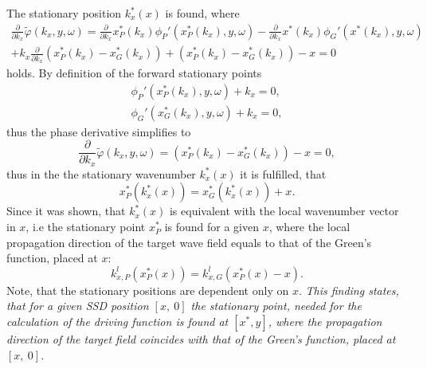 \documentclass[12pt,a4paper]{article}
\begin{document}
The stationary position $k_x^*(x)$ is found, where
\begin{multline}
\frac{\partial}{\partial k_x}
\tilde{\varphi}(k_x,y,\omega) = \frac{\partial}{\partial k_x}x_P^*(k_x) \phi_P'(x_P^*(k_x),y,\omega) -  \frac{\partial}{\partial k_x} x^*(k_x)\phi_G'(x^*(k_x),y,\omega) \\ + k_x \frac{\partial}{\partial k_x}\left( x_P^*(k_x) - x_G^*(k_x) \right) + \left( x_P^*(k_x) - x_G^*(k_x) \right) -  x = 0
\end{multline}
holds.
By definition of the forward stationary points
\begin{eqnarray}
\phi_P'(x_P^*(k_x),y,\omega) + k_x = 0,\\
\phi_G'(x_G^*(k_x),y,\omega) + k_x = 0,
\label{Forward_spa}
\end{eqnarray}
thus the phase derivative simplifies to
\begin{equation}
\frac{\partial}{\partial k_x}
\tilde{\varphi}(k_x,y,\omega) = \left( x_P^*(k_x) - x_G^*(k_x) \right) -  x = 0,
\end{equation}
thus in the the stationary wavenumber $k_x^*(x)$ it is fulfilled, that 
\begin{equation}
x_P^*(k_x^*(x)) = x_G^*(k_x^*(x)) + x.
\end{equation}
Since it was shown, that $k_x^*(x)$ is equivalent with the local wavenumber vector in $x$, i.e the stationary point $x^*_P$ is found for a given $x$, where the local propagation direction of the target wave field equals to that of the Green's function, placed at $x$:
\begin{equation}
k_{x,P}^l (x_P^*(x)) = k_{x,G}^l(x_P^*(x) - x). 
\end{equation}
Note, that the stationary positions are dependent only on $x$. \emph{This finding states, that for a given SSD position $[x,\ 0]$ the stationary point, needed for the calculation of the driving function is found at $[x^*,y]$, where the propagation direction of the target field coincides with that of the Green's function, placed at $[x,\ 0]$.}
\end{document}
